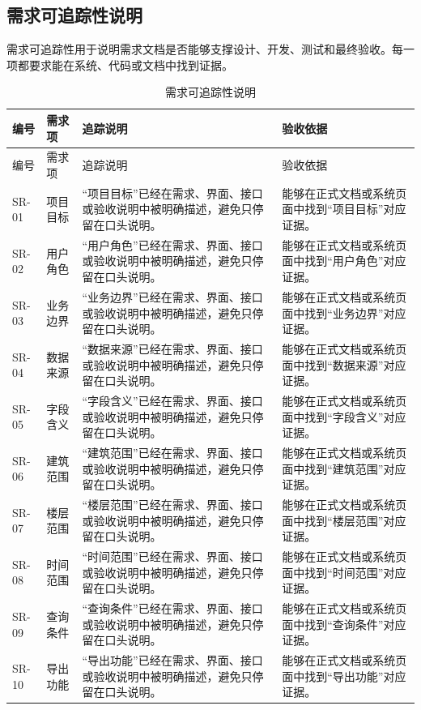 \documentclass[12pt,a4paper]{ctexart}
\begin{document}
\subsection{需求可追踪性说明}
需求可追踪性用于说明需求文档是否能够支撑设计、开发、测试和最终验收。每一项都要求能在系统、代码或文档中找到证据。
\begin{longtable}{L{1.7cm}L{3.0cm}L{6.2cm}L{4.4cm}}
\caption{需求可追踪性说明}\\
\toprule
编号 & 需求项 & 追踪说明 & 验收依据 \\
\midrule
\endfirsthead
\toprule
编号 & 需求项 & 追踪说明 & 验收依据 \\
\midrule
\endhead
SR-01 & 项目目标 & “项目目标”已经在需求、界面、接口或验收说明中被明确描述，避免只停留在口头说明。 & 能够在正式文档或系统页面中找到“项目目标”对应证据。 \\
SR-02 & 用户角色 & “用户角色”已经在需求、界面、接口或验收说明中被明确描述，避免只停留在口头说明。 & 能够在正式文档或系统页面中找到“用户角色”对应证据。 \\
SR-03 & 业务边界 & “业务边界”已经在需求、界面、接口或验收说明中被明确描述，避免只停留在口头说明。 & 能够在正式文档或系统页面中找到“业务边界”对应证据。 \\
SR-04 & 数据来源 & “数据来源”已经在需求、界面、接口或验收说明中被明确描述，避免只停留在口头说明。 & 能够在正式文档或系统页面中找到“数据来源”对应证据。 \\
SR-05 & 字段含义 & “字段含义”已经在需求、界面、接口或验收说明中被明确描述，避免只停留在口头说明。 & 能够在正式文档或系统页面中找到“字段含义”对应证据。 \\
SR-06 & 建筑范围 & “建筑范围”已经在需求、界面、接口或验收说明中被明确描述，避免只停留在口头说明。 & 能够在正式文档或系统页面中找到“建筑范围”对应证据。 \\
SR-07 & 楼层范围 & “楼层范围”已经在需求、界面、接口或验收说明中被明确描述，避免只停留在口头说明。 & 能够在正式文档或系统页面中找到“楼层范围”对应证据。 \\
SR-08 & 时间范围 & “时间范围”已经在需求、界面、接口或验收说明中被明确描述，避免只停留在口头说明。 & 能够在正式文档或系统页面中找到“时间范围”对应证据。 \\
SR-09 & 查询条件 & “查询条件”已经在需求、界面、接口或验收说明中被明确描述，避免只停留在口头说明。 & 能够在正式文档或系统页面中找到“查询条件”对应证据。 \\
SR-10 & 导出功能 & “导出功能”已经在需求、界面、接口或验收说明中被明确描述，避免只停留在口头说明。 & 能够在正式文档或系统页面中找到“导出功能”对应证据。 \\

\end{longtable}
\end{document}
